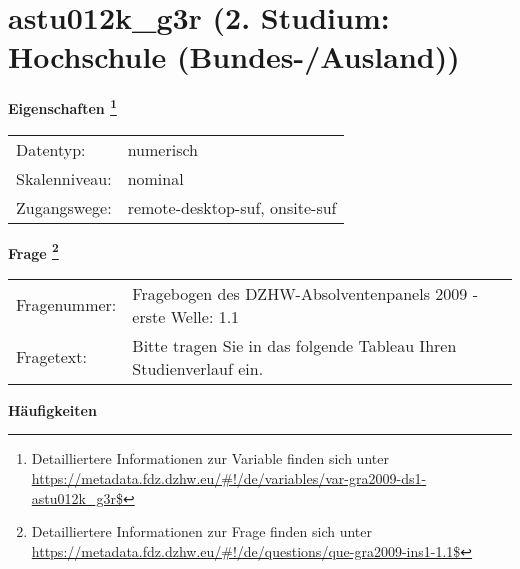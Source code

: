 
    \setcounter{footnote}{0}

    \vspace*{-1.8cm}
	\section{astu012k\_g3r (2. Studium: Hochschule (Bundes-/Ausland))}
	\label{section:astu012k_g3r}



    \vspace*{0.5cm}
    \noindent\textbf{Eigenschaften
	\footnote{Detailliertere Informationen zur Variable finden sich unter
		\url{https://metadata.fdz.dzhw.eu/\#!/de/variables/var-gra2009-ds1-astu012k_g3r$}}}\\
	\begin{tabularx}{\hsize}{@{}lX}
	Datentyp: & numerisch \\
	Skalenniveau: & nominal \\
	Zugangswege: &
	  remote-desktop-suf, 
	  onsite-suf
 \\
    \end{tabularx}



				\vspace*{0.5cm}
                \noindent\textbf{Frage
	                \footnote{Detailliertere Informationen zur Frage finden sich unter
		              \url{https://metadata.fdz.dzhw.eu/\#!/de/questions/que-gra2009-ins1-1.1$}}}\\
				\begin{tabularx}{\hsize}{@{}lX}
					Fragenummer: &
					  Fragebogen des DZHW-Absolventenpanels 2009 - erste Welle:
					  1.1
 \\
					Fragetext: & Bitte tragen Sie in das folgende Tableau Ihren Studienverlauf ein. \\
				\end{tabularx}





        		\vspace*{0.5cm}
                \noindent\textbf{Häufigkeiten}

